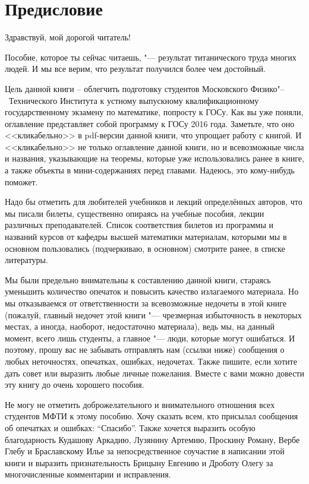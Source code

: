 \chapter{Предисловие}

\begin{center} 
	Здравствуй, мой дорогой читатель!
\end{center}

Пособие, которое ты сейчас читаешь, "--- результат титанического труда многих людей. И мы все верим, что результат получился более чем достойный. 

Цель данной книги – облегчить подготовку студентов Московского Физико"--~Технического Института к устному выпускному квалификационному государственному экзамену по математике, попросту к ГОСу. Как вы уже поняли, оглавление представляет собой программу к ГОСу 2016 года. Заметьте, что оно <<кликабельно>> в pdf-версии данной книги, что упрощает работу с книгой. И <<кликабельно>> не только оглавление данной книги, но и всевозможные числа и названия, указывающие на теоремы, которые уже использовались ранее в книге, а также объекты в мини-содержаниях перед главами. Надеюсь, это кому-нибудь поможет. 

Надо бы отметить для любителей учебников и лекций определённых авторов, что мы писали билеты, существенно опираясь на учебные пособия, лекции различных преподавателей. Список соответствия билетов из программы и названий курсов от кафедры высшей математики материалам, которыми мы в основном пользовались (подчеркиваю, в основном) смотрите ранее, в списке литературы.

Мы были предельно внимательны к составлению данной книги, стараясь уменьшить количество опечаток и повысить качество излагаемого материала. Но мы отказываемся от ответственности за всевозможные недочеты в этой книге (пожалуй, главный недочет этой книги "--- чрезмерная избыточность в некоторых местах, а иногда, наоборот, недостаточно материала), ведь мы, на данный момент, всего лишь студенты, а главное "--- люди, которые могут ошибаться. И поэтому, прошу вас не забывать отправлять нам (ссылки ниже) сообщения о любых неточностях, опечатках, ошибках, недочетах. Также пишите, если хотите дать совет или выразить любые личные пожелания. Вместе с вами можно довести эту книгу до очень хорошего пособия.

Не могу не отметить доброжелательного и внимательного отношения всех студентов МФТИ к этому пособию. Хочу сказать всем, кто присылал сообщения об опечатках и ошибках: ``Спасибо''. Также хочется выразить особую благодарность Кудашову Аркадию, Лузянину Артемию, Проскину Роману, Вербе Глебу и Браславскому Илье за непосредственное соучастие в написании этой книги и выразить признательность Брицыну Евгению и Дроботу Олегу за многочисленные комментарии и исправления.


